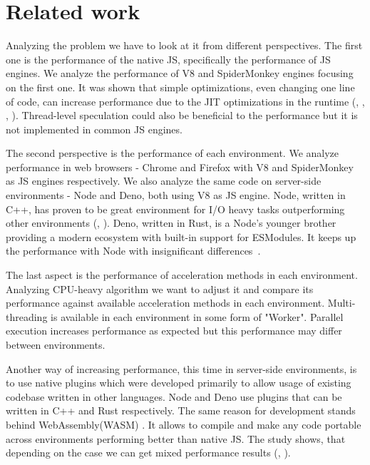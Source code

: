 \section{Related work}
Analyzing the problem we have to look at it from different perspectives. The first one is the performance of the native JS, specifically the performance of JS engines. We analyze the performance of V8 and SpiderMonkey engines focusing on the first one. It was shown that simple optimizations, even changing one line of code, can increase performance due to the JIT optimizations in the runtime (\cite{meurer_2017}, \cite{meurer_2019}, \cite{gong2015jitprof}, \cite{selakovic2016performance}). Thread-level speculation could also be beneficial to the performance \cite{martinsen2017combining} but it is not implemented in common JS engines.

The second perspective is the performance of each environment. We analyze performance in web browsers - Chrome and Firefox with V8 and SpiderMonkey as JS engines respectively. We also analyze the same code on server-side environments - Node and Deno, both using V8 as JS engine. Node, written in C++, has proven to be great environment for I/O heavy tasks outperforming other environments (\cite{lei2014performance}, \cite{chitra2017performance}). Deno, written in Rust, is a Node's younger brother providing a modern ecosystem with built-in support for ESModules. It keeps up the performance with Node with insignificant differences~\cite{choubey_2021}.

The last aspect is the performance of acceleration methods in each environment. Analyzing CPU-heavy algorithm we want to adjust it and compare its performance against available acceleration methods in each environment. Multi-threading is available in each environment in some form of "Worker". Parallel execution increases performance as expected \cite{djarv2020performance} but this performance may differ between environments. 

Another way of increasing performance, this time in server-side environments, is to use native plugins which were developed primarily to allow usage of existing codebase written in other languages. Node and Deno use plugins that can be written in C++ and Rust respectively. The same reason for development stands behind WebAssembly(WASM) \cite{niessen2020webassembly}. It allows to compile and make any code portable across environments performing better than native JS. The study shows, that depending on the case we can get mixed performance results (\cite{yan2021understanding}, \cite{jangda2019not}). 

